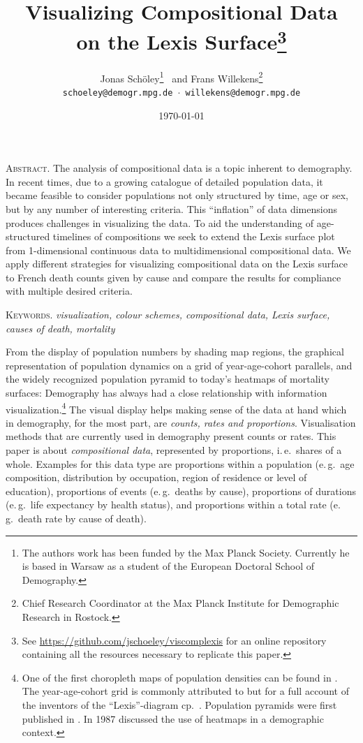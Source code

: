 \documentclass[a4paper]{scrartcl}
\title{Visualizing Compositional Data\\on the Lexis Surface\footnote{See \url{https://github.com/jschoeley/viscomplexis} for an online repository containing all the resources necessary to replicate this paper.}}
\author{Jonas Schöley\footnote{The authors work has been funded by the Max Planck Society. Currently he is based in Warsaw as a student of the European Doctoral School of Demography.} \, and Frans Willekens\footnote{Chief Research Coordinator at the Max Planck Institute for Demographic Research in Rostock.}\\
\texttt{schoeley@demogr.mpg.de $\cdot$ willekens@demogr.mpg.de}}
\date{\today}
\newenvironment{abstract2}{
  \begin{center}
      \begin{minipage}{0.9\linewidth}\small
      \textsc{Abstract.}}{\\
      \end{minipage}
  \end{center}
}
\begin{document}
\maketitle


\begin{abstract2}
The analysis of compositional data is a topic inherent to demography. In recent times, due to a growing catalogue of detailed population data, it became feasible to consider populations not only structured by time, age or sex, but by any number of interesting criteria. This \enquote{inflation} of data dimensions produces challenges in visualizing the data. To aid the understanding of age-structured timelines of compositions we seek to extend the Lexis surface plot from 1-dimensional continuous data to multidimensional compositional data. We apply different strategies for visualizing compositional data on the Lexis surface to French death counts given by cause and compare the results for compliance with multiple desired criteria.

\smallskip

\textsc{Keywords.} \emph{visualization, colour schemes, compositional data, Lexis surface, causes of death, mortality}
\end{abstract2}

From the display of population numbers by shading map regions, the graphical representation of population dynamics on a grid of year-age-cohort parallels, and the widely recognized population pyramid to today's heatmaps of mortality surfaces: Demography has always had a close relationship with information visualization.\footnote{One of the first choropleth maps of population densities can be found in \textcite{Dangeville1836}. The year-age-cohort grid is commonly attributed to \textcite{Lexis1875} but for a full account of the inventors of the \enquote{Lexis}-diagram cp.~\textcite{Vandeschrick2001}. Population pyramids were first published in \textcite{Walker1874}. In 1987 \textcite{Vaupel1987} discussed the use of heatmaps in a demographic context.} The visual display helps making sense of the data at hand which in demography, for the most part, are \emph{counts, rates and proportions}. Visualisation methods that are currently used in demography present counts or rates. This paper is about \emph{compositional data}, represented by proportions, i.\,e.~shares of a whole. Examples for this data type are proportions within a population (e.\,g.~age composition, distribution by occupation, region of residence or level of education), proportions of events (e.\,g.~deaths by cause), proportions of durations (e.\,g.~life expectancy by health status), and proportions within a total rate (e.\,g.~death rate by cause of death).
\end{document}

